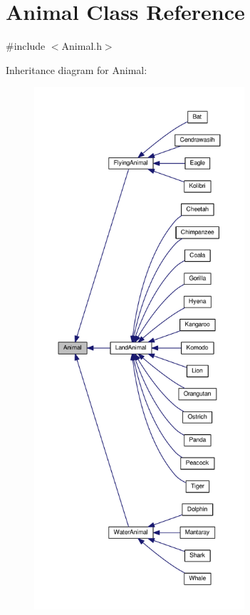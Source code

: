 \hypertarget{classAnimal}{}\section{Animal Class Reference}
\label{classAnimal}


{\ttfamily \#include $<$Animal.\+h$>$}



Inheritance diagram for Animal\+:
\nopagebreak
\begin{figure}[H]
\begin{center}
\leavevmode
\includegraphics[height=550pt]{classAnimal__inherit__graph}
\end{center}
\end{figure}


